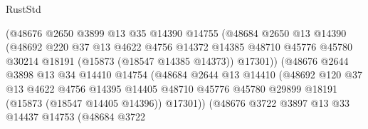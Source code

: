 \begin{lexlean}{RustStd}
\begin{coremodule}
                              (@48676
                                @2650
                                @3899
                                @13
                                @35
                                @14390
                                @14755
                                (@48684
                                  @2650
                                  @13
                                  @14390
                                  (@48692
                                    @220
                                    @37
                                    @13
                                    @4622
                                    @4756
                                    @14372
                                    @14385
                                    @48710
                                    @45776
                                    @45780
                                    @30214
                                    @18191
                                    (@15873 (@18547 @14385 @14373))
                                    @17301))
                                (@48676
                                  @2644
                                  @3898
                                  @13
                                  @34
                                  @14410
                                  @14754
                                  (@48684
                                    @2644
                                    @13
                                    @14410
                                    (@48692
                                      @120
                                      @37
                                      @13
                                      @4622
                                      @4756
                                      @14395
                                      @14405
                                      @48710
                                      @45776
                                      @45780
                                      @29899
                                      @18191
                                      (@15873 (@18547 @14405 @14396))
                                      @17301))
                                  (@48676
                                    @3722
                                    @3897
                                    @13
                                    @33
                                    @14437
                                    @14753
                                    (@48684
                                      @3722

\end{coremodule}
\end{lexlean}
